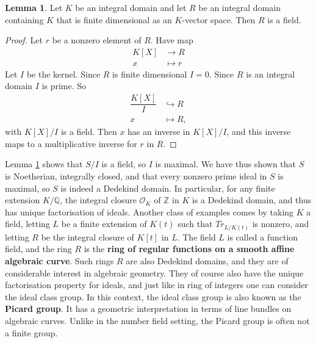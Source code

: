 \documentclass{article}
\newcommand{\Z}{\mathbb{Z}}
\newcommand{\Q}{\mathbb{Q}}
\newcommand{\rb}[1]{\left( #1 \right)}
\renewcommand{\sb}[1]{\left[ #1 \right]}
\theoremstyle{definition}\newtheorem{definition}{Definition}[subsection]
\theoremstyle{definition}\newtheorem{remark}[definition]{Remark}
\theoremstyle{definition}\newtheorem*{example}{Example}
\theoremstyle{definition}\newtheorem*{note}{Note}
\newtheorem{lemma}[definition]{Lemma}
\begin{document}
\begin{lemma}
\label{lem:12.3.4}
Let $ K $ be an integral domain and let $ R $ be an integral domain containing $ K $ that is finite dimensional as an $ K $-vector space. Then $ R $ is a field.
\end{lemma}

\begin{proof}
Let $ r $ be a nonzero element of $ R $. Have map
\begin{align*}
K\sb{X} & \to R \\
x & \mapsto r
\end{align*}
Let $ I $ be the kernel. Since $ R $ is finite dimensional $ I = 0 $. Since $ R $ is an integral domain $ I $ is prime. So
\begin{align*}
\dfrac{K\sb{X}}{I} & \hookrightarrow R \\
x & \mapsto R,
\end{align*}
with $ K\sb{X} / I $ is a field. Then $ x $ has an inverse in $ K\sb{X} / I $, and this inverse maps to a multiplicative inverse for $ r $ in $ R $.
\end{proof}

Lemma \ref{lem:12.3.4} shows that $ S / I $ is a field, so $ I $ is maximal. We have thus shown that $ S $ is Noetherian, integrally closed, and that every nonzero prime ideal in $ S $ is maximal, so $ S $ is indeed a Dedekind domain. In particular, for any finite extension $ K / \Q $, the integral closure $ \mathcal{O}_K $ of $ \Z $ in $ K $ is a Dedekind domain, and thus has unique factorisation of ideals. Another class of examples comes by taking $ K $ a field, letting $ L $ be a finite extension of $ K\rb{t} $ such that $ Tr_{L / K\rb{t}} $ is nonzero, and letting $ R $ be the integral closure of $ K\sb{t} $ in $ L $. The field $ L $ is called a function field, and the ring $ R $ is the \textbf{ring of regular functions on a smooth affine algebraic curve}. Such rings $ R $ are also Dedekind domains, and they are of considerable interest in algebraic geometry. They of course also have the unique factorisation property for ideals, and just like in ring of integers one can consider the ideal class group. In this context, the ideal class group is also known as the \textbf{Picard group}. It has a geometric interpretation in terms of line bundles on algebraic curves. Unlike in the number field setting, the Picard group is often not a finite group.

\pagebreak

\end{document}
